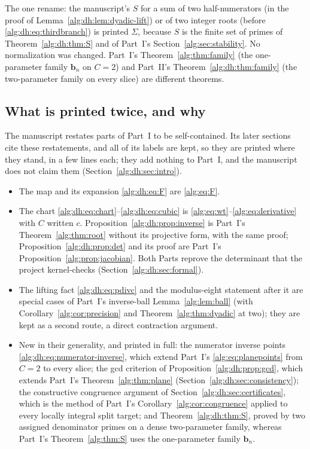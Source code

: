 \documentclass[11pt]{article}
\numberwithin{equation}{section}
\theoremstyle{plain}
\theoremstyle{plain}
\theoremstyle{plain}
\theoremstyle{definition}
\theoremstyle{definition}
\theoremstyle{definition}
\theoremstyle{remark}
\newcommand{\target}{\boldsymbol b}
\begin{document}
The one rename: the manuscript's $S$ for a sum of two half-numerators (in
the proof of Lemma~\ref{alg:dh:lem:dyadic-lift}) or of two integer roots
(before \eqref{alg:dh:eq:thirdbranch}) is printed $\Sigma$, because $S$ is
the finite set of primes of Theorem~\ref{alg:dh:thm:S} and of Part~I's
Section~\ref{alg:sec:stability}. No normalization was changed. Part~I's
Theorem~\ref{alg:thm:family} (the one-parameter family $\target_n$ on
$C=2$) and Part~II's Theorem~\ref{alg:dh:thm:family} (the two-parameter
family on every slice) are different theorems.

\subsection{What is printed twice, and why}\label{alg:dh:sec:duplicates}
The manuscript restates parts of Part~I to be self-contained. Its later
sections cite these restatements, and all of its labels are kept, so they
are printed where they stand, in a few lines each; they add nothing to
Part~I, and the manuscript does not claim them
(Section~\ref{alg:dh:sec:intro}).
\begin{itemize}[itemsep=2pt,topsep=3pt]
\item The map and its expansion \eqref{alg:dh:eq:F} are \eqref{alg:eq:F}.
\item The chart \eqref{alg:dh:eq:chart}--\eqref{alg:dh:eq:cubic} is
\eqref{alg:eq:wt}--\eqref{alg:eq:derivative} with $C$ written $c$.
Proposition~\ref{alg:dh:prop:inverse} is Part~I's
Theorem~\ref{alg:thm:root} without its projective form, with the same
proof; Proposition~\ref{alg:dh:prop:det} and its proof are Part~I's
Proposition~\ref{alg:prop:jacobian}. Both Parts reprove the determinant
that the project kernel-checks (Section~\ref{alg:dh:sec:formal}).
\item The lifting fact \eqref{alg:dh:eq:pdivc} and the modulus-eight
statement after it are special cases of Part~I's inverse-ball
Lemma~\ref{alg:lem:ball} (with Corollary~\ref{alg:cor:precision} and
Theorem~\ref{alg:thm:dyadic} at two); they are kept as a second route,
a direct contraction argument.
\item New in their generality, and printed in full: the numerator
inverse points \eqref{alg:dh:eq:numerator-inverse}, which extend Part~I's
\eqref{alg:eq:planepoints} from $C=2$ to every slice; the gcd criterion of
Proposition~\ref{alg:dh:prop:gcd}, which extends Part~I's
Theorem~\ref{alg:thm:plane} (Section~\ref{alg:dh:sec:consistency}); the
constructive congruence argument of Section~\ref{alg:dh:sec:certificates},
which is the method of Part~I's Corollary~\ref{alg:cor:congruence} applied
to every locally integral split target; and Theorem~\ref{alg:dh:thm:S},
proved by two assigned denominator primes on a dense two-parameter family,
whereas Part~I's Theorem~\ref{alg:thm:S} uses the one-parameter family
$\target_n$.
\end{itemize}
\end{document}
